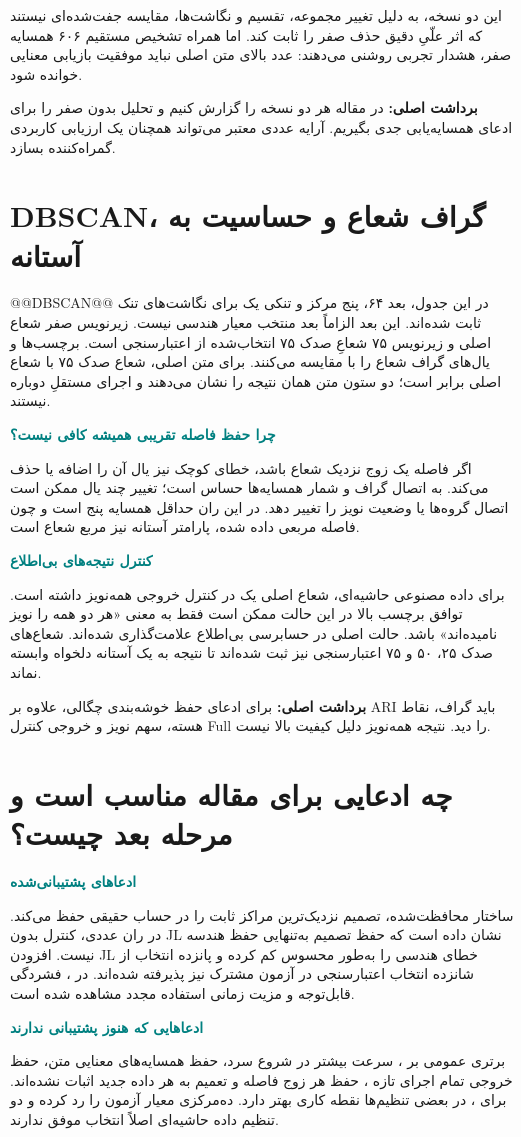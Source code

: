 \documentclass[11pt,a4paper]{article}
\newcommand{\lesson}[1]{\clearpage\section{#1}}
\newcommand{\key}[1]{\par\vspace{4pt}\noindent\colorbox{pale}{\parbox{\dimexpr\textwidth-2\fboxsep\relax}{\textbf{برداشت اصلی:} #1}}\par\vspace{3pt}}
\newcommand{\sub}[1]{\par\vspace{3pt}\textbf{\textcolor{teal}{#1}}\par}
\begin{document}
این دو نسخه، به دلیل تغییر مجموعه، تقسیم و نگاشت‌ها، مقایسه جفت‌شده‌ای نیستند که اثر علّیِ دقیق حذف صفر را ثابت کند. اما همراه تشخیص مستقیم ۶۰۶ همسایه صفر، هشدار تجربی روشنی می‌دهند: عدد بالای متن اصلی نباید موفقیت بازیابی معنایی خوانده شود.
\key{در مقاله هر دو نسخه را گزارش کنیم و تحلیل بدون صفر را برای ادعای همسایه‌یابی جدی بگیریم. آرایه عددی معتبر می‌تواند همچنان یک ارزیابی کاربردی گمراه‌کننده بسازد.}

\lesson{DBSCAN، گراف شعاع و حساسیت به آستانه}
@@DBSCAN@@
در این جدول، بعد ۶۴، پنج مرکز و تنکی یک برای نگاشت‌های تنک ثابت شده‌اند. این بعد الزاماً بعد منتخب معیار هندسی نیست. زیرنویس صفر شعاع اصلی و زیرنویس ۷۵ شعاعِ صدک ۷۵ انتخاب‌شده از اعتبارسنجی است.  برچسب‌ها و  یال‌های گراف شعاع را با  مقایسه می‌کنند.
برای متن اصلی، شعاع صدک ۷۵ با شعاع اصلی برابر است؛ دو ستون متن همان نتیجه را نشان می‌دهند و اجرای مستقلِ دوباره نیستند.

\sub{چرا حفظ فاصله تقریبی همیشه کافی نیست؟}
اگر فاصله یک زوج نزدیک شعاع باشد، خطای کوچک نیز یال آن را اضافه یا حذف می‌کند.  به اتصال گراف و شمار همسایه‌ها حساس است؛ تغییر چند یال ممکن است اتصال گروه‌ها یا وضعیت نویز را تغییر دهد. در این ران حداقل همسایه پنج است و چون فاصله مربعی داده شده، پارامتر آستانه نیز مربع شعاع است.

\sub{کنترل نتیجه‌های بی‌اطلاع}
برای داده مصنوعی حاشیه‌ای، شعاع اصلی یک در کنترل  خروجی همه‌نویز داشته است. توافق برچسب بالا در این حالت ممکن است فقط به معنی «هر دو همه را نویز نامیده‌اند» باشد.  حالت اصلی در حسابرسی بی‌اطلاع علامت‌گذاری شده‌اند. شعاع‌های صدک ۲۵، ۵۰ و ۷۵ اعتبارسنجی نیز ثبت شده‌اند تا نتیجه به یک آستانه دلخواه وابسته نماند.

\key{برای ادعای حفظ خوشه‌بندی چگالی، علاوه بر ARI باید گراف، نقاط هسته، سهم نویز و خروجی کنترل Full را دید. نتیجه همه‌نویز دلیل کیفیت بالا نیست.}

\lesson{چه ادعایی برای مقاله مناسب است و مرحله بعد چیست؟}
\sub{ادعاهای پشتیبانی‌شده}
ساختار محافظت‌شده، تصمیم نزدیک‌ترین مراکز ثابت را در حساب حقیقی حفظ می‌کند. در ران عددی، کنترل بدون JL نشان داده است که حفظ تصمیم به‌تنهایی حفظ هندسه نیست. افزودن JL خطای هندسی را به‌طور محسوس کم کرده و پانزده انتخاب از شانزده انتخاب اعتبارسنجی در آزمون مشترک نیز پذیرفته شده‌اند. در ، فشردگی قابل‌توجه و مزیت زمانی استفاده مجدد مشاهده شده است.

\sub{ادعاهایی که هنوز پشتیبانی ندارند}
برتری عمومی بر ، سرعت بیشتر در شروع سرد، حفظ همسایه‌های معنایی متن، حفظ خروجی تمام اجرای تازه ، حفظ هر زوج فاصله و تعمیم به هر داده جدید اثبات نشده‌اند. برای ،  در بعضی تنظیم‌ها نقطه کاری بهتر دارد.  ده‌مرکزی معیار آزمون را رد کرده و دو تنظیم داده حاشیه‌ای اصلاً انتخاب موفق ندارند.
\end{document}
